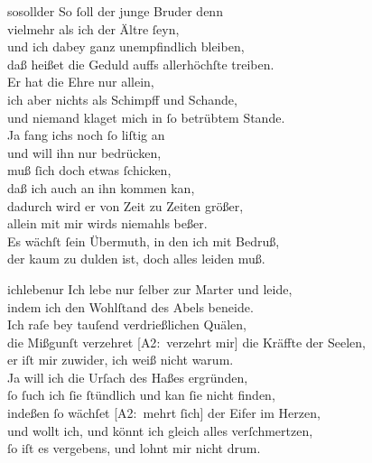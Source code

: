 \documentclass[abbrwidth=6em,tocstyle=ref-genre]{ees}
\newcommand\altlyrics[1]{[\textmd{A2}:~#1]}
\begin{document}
{\begin{movement}{sosollder}
  \voice[Cain]
  So ſoll der junge Bruder denn\\
  vielmehr als ich der Ältre ſeyn,\\
  und ich dabey ganz unempfindlich bleiben,\\
  daß heißet die Geduld auffs allerhöchſte treiben.\\
  Er hat die Ehre nur allein,\\
  ich aber nichts als Schimpff und Schande,\\
  und niemand klaget mich in ſo betrübtem Stande.\\
  Ja fang ichs noch ſo liſtig an\\
  und will ihn nur bedrücken,\\
  muß ſich doch etwas ſchicken,\\
  daß ich auch an ihn kommen kan,\\
  dadurch wird er von Zeit zu Zeiten größer,\\
  allein mit mir wirds niemahls beßer.\\
  Es wächſt ſein Übermuth, in den ich mit Bedruß,\\
  der kaum zu dulden ist, doch alles leiden muß.
\end{movement}

\begin{movement}{ichlebenur}
  \voice[Cain]
  Ich lebe nur ſelber zur Marter und leide,\\
  indem ich den Wohlſtand des Abels beneide.\\
  Ich raſe bey tauſend verdrießlichen Quälen,\\
  die Mißgunſt verzehret \altlyrics{verzehrt mir} die Kräffte der Seelen,\\
  er iſt mir zuwider, ich weiß nicht warum.\\
  Ja will ich die Urſach des Haßes ergründen,\\
  ſo ſuch ich ſie ſtündlich und kan ſie nicht finden,\\
  indeßen ſo wächſet \altlyrics{mehrt ſich} der Eifer im Herzen,\\
  und wollt ich, und könnt ich gleich alles verſchmertzen,\\
  ſo iſt es vergebens, und lohnt mir nicht drum.
\end{movement}

}
\end{document}
